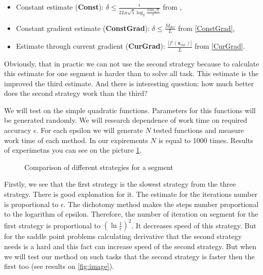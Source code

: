 \documentclass[12pt]{article}
\begin{document}
\begin{itemize}
	\item Constant estimate (\textbf{Const}): $\delta \leq \frac{\epsilon}{2La\sqrt{5}\log_2\frac{2Ma\sqrt{2}}{\epsilon}}$ from \cite{Ston_Pas},
	\item Constant gradient estimate (\textbf{ConstGrad}): $\delta \leq \frac{M_{der}}{L}$ from \ref{ConstGrad},
	\item Estimate through current gradient (\textbf{CurGrad}): $\frac{|f'(\textbf{x}_{cur})|}{L}$ from \ref{CurGrad}.
\end{itemize}

Obviously, that in practic we can not use the second strategy because to calculate this estimate for one segment is harder than to solve all task. This estimate is the improved the third estimate. And there is interesting question: how much better does the second strategy work than the third?

We will test on the simple quadratic functions. Parameters for this functions will be generated randomly. We will research dependence of work time on required accuracy $\epsilon$. For each epsilon we will generate $N$ tested functions and measure work time of each method. In our expirements $N$ is equal to 1000 times. Results of experimetns you can see on the picture \ref{res}.

\begin{figure}[h!]
\label{res}
 \caption{Comparison of different strategies for a segment}
\end{figure}

Firstly, we see that the first strategy is the slowest strategy from the three strategy. There is good explonation for it. The estimate for the iterations number is proportional to $\epsilon$. The dichotomy method makes the steps number proportional to the logarithm of epsilon. Therefore, the number of iteration on segment for the first strategy is proportional to $(\ln \frac{1}{\epsilon})^2$. It decreases speed of this strategy. But for the saddle point problems calculating derivative that the second strategy needs is a hard and this fact can increase speed of the second strategy. But when we will test our method on such tasks that the second strategy is faster then the first too (see results on \ref{fig:image}).
\end{document}
